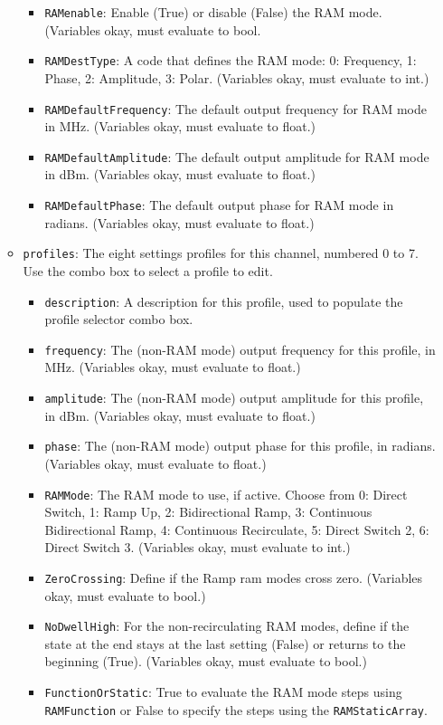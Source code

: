 \documentclass[pdftex,11pt,letterpaper]{article}
\begin{document}
\begin{itemize}
\begin{itemize}
\begin{itemize}
\item \texttt{RAMenable}:  Enable (True) or disable (False) the RAM mode.  (Variables okay, must evaluate to bool.
\item \texttt{RAMDestType}:  A code that defines the RAM mode: 0: Frequency, 1: Phase, 2: Amplitude, 3: Polar.  (Variables okay, must evaluate to int.)
\item \texttt{RAMDefaultFrequency}:  The default output frequency for RAM mode in MHz.  (Variables okay, must evaluate to float.)
\item \texttt{RAMDefaultAmplitude}:  The default output amplitude for RAM mode in dBm.  (Variables okay, must evaluate to float.)
\item \texttt{RAMDefaultPhase}:  The default output phase for RAM mode in radians.  (Variables okay, must evaluate to float.)
\end{itemize}
\item \texttt{profiles}:  The eight settings profiles for this channel, numbered 0 to 7.  Use the combo box to select a profile to edit.
\begin{itemize}
\item \texttt{description}:  A description for this profile, used to populate the profile selector combo box.
\item \texttt{frequency}:  The (non-RAM mode) output frequency for this profile, in MHz.  (Variables okay, must evaluate to float.)
\item \texttt{amplitude}:  The (non-RAM mode) output amplitude for this profile, in dBm.  (Variables okay, must evaluate to float.)
\item \texttt{phase}:  The (non-RAM mode) output phase for this profile, in radians.  (Variables okay, must evaluate to float.)
\item \texttt{RAMMode}:  The RAM mode to use, if active.  Choose from 0: Direct Switch, 1: Ramp Up, 2: Bidirectional Ramp, 3: Continuous Bidirectional Ramp, 4: Continuous Recirculate, 5: Direct Switch 2, 6: Direct Switch 3.  (Variables okay, must evaluate to int.)
\item \texttt{ZeroCrossing}:  Define if the Ramp ram modes cross zero.  (Variables okay, must evaluate to bool.)
\item \texttt{NoDwellHigh}:  For the non-recirculating RAM modes, define if the state at the end stays at the last setting (False) or returns to the beginning (True).  (Variables okay, must evaluate to bool.)
\item  \texttt{FunctionOrStatic}:  True to evaluate the RAM mode steps using \texttt{RAMFunction} or False to specify the steps using the \texttt{RAMStaticArray}.

\end{itemize}
\end{itemize}
\end{itemize}
\end{document}
